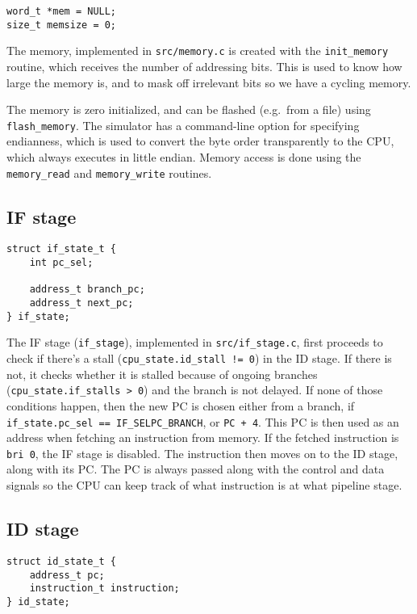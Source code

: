 \documentclass[]{IEEEtran}
\begin{document}
\begin{verbatim}
word_t *mem = NULL;
size_t memsize = 0;
\end{verbatim}

The memory, implemented in \verb|src/memory.c| is created with the \verb|init_memory|
routine, which receives the number of addressing bits. This is used to know how
large the memory is, and to mask off irrelevant bits so we have a cycling memory.

The memory is zero initialized, and can be flashed (e.g.\ from a file) using
\verb|flash_memory|. The simulator has a command-line option for specifying
endianness, which is used to convert the byte order transparently to the CPU,
which always executes in little endian. Memory access is done using the
\verb|memory_read| and \verb|memory_write| routines.


\subsection{IF stage}

\begin{verbatim}
struct if_state_t {
    int pc_sel;

    address_t branch_pc;
    address_t next_pc;
} if_state;
\end{verbatim}

The IF stage (\verb|if_stage|), implemented in \verb|src/if_stage.c|, first proceeds to check if
there's a stall (\verb|cpu_state.id_stall != 0|) in the ID
stage. If there is not, it checks whether it is stalled because of ongoing
branches (\verb|cpu_state.if_stalls > 0|) and the branch is not delayed. If none
of those conditions happen, then the new PC is chosen either from a branch, if
\verb|if_state.pc_sel == IF_SELPC_BRANCH|, or \verb|PC + 4|. This
PC is then used as an address when fetching an instruction from memory. If the
fetched instruction is \verb|bri 0|, the IF stage is disabled. The instruction
then moves on to the ID stage, along with its PC. The PC is always passed along
with the control and data signals so the CPU can keep track of what instruction
is at what pipeline stage.


\subsection{ID stage}

\begin{verbatim}
struct id_state_t {
    address_t pc;
    instruction_t instruction;
} id_state;
\end{verbatim}
\end{document}
